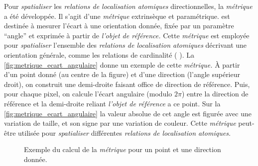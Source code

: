 Pour \emph{spatialiser} les \emph{relations de localisation atomiques}
directionnelles, la \emph{métrique}  a été
développée. Il s'agit d'une \emph{métrique} extrinsèque et
paramétrique.  est destinée à mesurer l'écart à
une orientation donnée, fixée par un paramètre \enquote{angle} et
exprimée à partir de \emph{l'objet de référence.} Cette
\emph{métrique} est employée pour \emph{spatialiser} l'ensemble des
\emph{relations de localisation atomiques} décrivant une orientation
générale, comme les relations de cardinalité (\eg
{}). La \autoref{fig:metrique_ecart_angulaire}
donne un exemple de cette \emph{métrique.} À partir d'un point donné
(au centre de la figure) et d'une direction (l'angle supérieur droit),
on construit une demi-droite faisant office de direction de
référence. Puis, pour chaque pixel, on calcule l'écart angulaire
(modulo $2\pi$) entre la direction de référence et la demi-droite
reliant \emph{l'objet de référence} a ce point. Sur la
\autoref{fig:metrique_ecart_angulaire} la valeur absolue de cet angle
est figurée avec une variation de taille, et son signe par une
variation de couleur. Cette \emph{métrique} peut-être utilisée pour
\emph{spatialiser} différentes \emph{relations de localisation
  atomiques.}

\begin{figure}
  \centering
  
  \caption{Exemple du calcul de la \emph{métrique}
    \protect{} pour un point et une direction
    donnée.}
  \label{fig:metrique_ecart_angulaire}
\end{figure}

